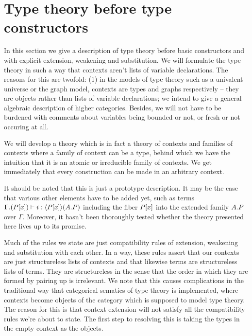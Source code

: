 \section{Type theory before type constructors}\label{tt}
In this section we give a description of type theory before basic
constructors and with explicit extension, weakening and substitution. We will
formulate the type theory in such a way that contexts aren't lists of variable
declarations. The reasons for this are twofold: (1) in the models of type theory
such as a univalent universe or the graph model, contexts are types and graphs
respectively -- they are objects rather than lists of variable declarations; we
intend to give a general algebraic description of higher categories. Besides,
we will not have to be burdened with comments about variables being bounded or not, or fresh or
not occuring at all.

We will develop a theory which is in fact a theory of contexts and families of
contexts where a family of context can be a type, behind which we have the
intuition that it is an atomic or irreducible family of contexts. We get immediately
that every construction can be made in an arbitrary context. 

It should be noted that this is just a prototype description. It may be the case
that various other elements have to be added yet, such as terms
$\jterm{\ctxext{\Gamma}{\subst{x}{P}}}{\ctxwk{\subst{x}{P}}{\ctxext{A}{P}}}{i}$
including the fiber $\subst{x}{P}$ into the extended family $\ctxext{A}{P}$ over
$\Gamma$. Moreover, it hasn't been thoroughly tested whether the theory presented
here lives up to its promise.

Much of the rules we state are just compatibility rules of extension, weakening
and substitution with each other. In a way, these rules assert that our contexts
are just structureless lists of contexts and that likewise terms are structureless
lists of terms. They are structureless in the sense that the order in which
they are formed by pairing up is irrelevant. We note that this causes complications
in the traditional way that categorical sematics of type theory is implemented,
where contexts become objects of the category which is supposed to model type
theory. The reason for this is that context extension will not satisfy all the
compatibility rules we're about to state. The first step to resolving this is taking
the types in the empty context as the objects. 

